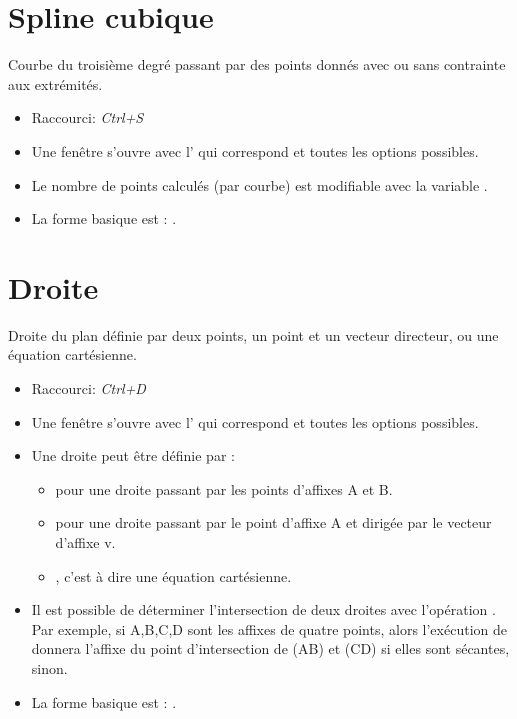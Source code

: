 \section{Spline cubique}

Courbe du troisième degré passant par des points donnés avec ou sans contrainte aux extrémités.

\begin{itemize}
\item Raccourci: \textsl{Ctrl+S}
\item Une fenêtre s'ouvre avec l' qui correspond et toutes les options possibles.
\item Le nombre de points calculés (par courbe) est modifiable avec la variable .
\item La forme basique est : .
\end{itemize}

\section{Droite}

Droite du plan définie par deux points, un point et un vecteur directeur, ou une équation cartésienne.

\begin{itemize}
\item Raccourci: \textsl{Ctrl+D}
\item Une fenêtre s'ouvre avec l' qui correspond et toutes les options possibles.
\item Une droite peut être définie par :
    \begin{itemize}
    \item \co{[A,B]} pour une droite passant par les points d'affixes A et B.
    \item  \co{[A,A+v]} pour une droite passant par le point d'affixe A et dirigée par le vecteur d'affixe v.
    \item  {}, c'est à dire une équation cartésienne.
    \end{itemize}

\item Il est possible de déterminer l'intersection de deux droites avec l'opération . Par exemple, si A,B,C,D sont les affixes de quatre points, alors l'exécution de  donnera l'affixe du point d'intersection de (AB) et (CD) si elles sont sécantes, \Nil sinon.
\item La forme basique est : .
\end{itemize}


